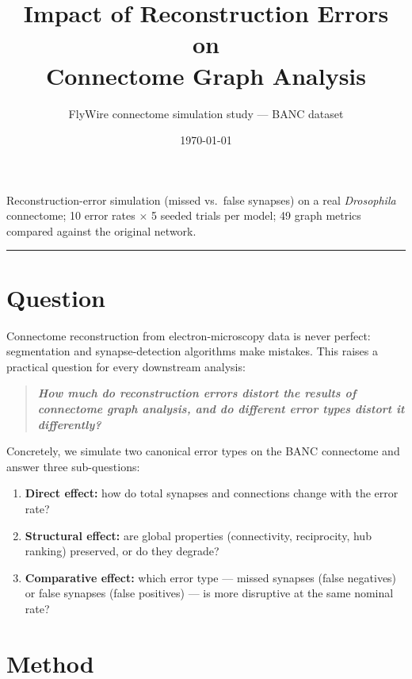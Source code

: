 \documentclass[11pt,a4paper]{article}
\title{\color{navy}\Large\bfseries Impact of Reconstruction Errors on\\[2pt]
Connectome Graph Analysis\vspace{-2pt}}
\author{\normalsize FlyWire connectome simulation study --- BANC dataset}
\date{\normalsize \today}
\begin{document}


\maketitle
\vspace{-1.2em}
\begin{center}
\small Reconstruction-error simulation (missed vs.\ false synapses) on a real
\textit{Drosophila} connectome; 10 error rates $\times$ 5 seeded trials per
model; 49 graph metrics compared against the original network.
\end{center}
\vspace{0.4em}
\hrule
\vspace{0.6em}

\section{Question}
Connectome reconstruction from electron-microscopy data is never perfect:
segmentation and synapse-detection algorithms make mistakes.  This raises a
practical question for every downstream analysis:

\begin{quote}
\itshape
\textbf{How much do reconstruction errors distort the results of connectome
graph analysis, and do different error types distort it differently?}
\end{quote}

Concretely, we simulate two canonical error types on the BANC connectome and
answer three sub-questions:

\begin{enumerate}
  \item \textbf{Direct effect:} how do total synapses and connections change
        with the error rate?
  \item \textbf{Structural effect:} are global properties (connectivity,
        reciprocity, hub ranking) preserved, or do they degrade?
  \item \textbf{Comparative effect:} which error type --- missed synapses
        (false negatives) or false synapses (false positives) --- is more
        disruptive at the same nominal rate?
\end{enumerate}

\section{Method}
\end{document}
